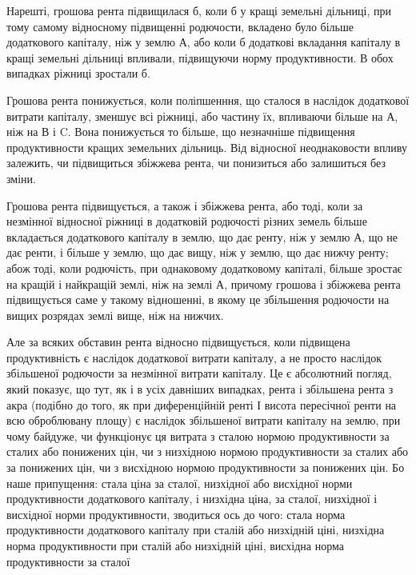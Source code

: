 
Нарешті, грошова рента підвищилася б, коли б у кращі земельні дільниці,
при тому самому відносному підвищенні родючости, вкладено було більше
додаткового капіталу, ніж у землю А, або коли б додаткові вкладання капіталу в кращі
земельні дільниці впливали, підвищуючи норму продуктивности. В обох випадках
ріжниці зростали б.

Грошова рента понижується, коли поліпшенння, що сталося в наслідок
додаткової витрати капіталу, зменшує всі ріжниці, або частину їх, впливаючи
більше на А, ніж на В і C. Вона понижується то більше, що незначніше
підвищення продуктивности кращих земельних дільниць. Від відносної неоднаковости
впливу залежить, чи підвищиться збіжжева рента, чи понизиться або
залишиться без зміни.

Грошова рента підвищується, а також і збіжжева рента, або тоді, коли за
незмінної відносної ріжниці в додатковій родючості різних земель більше вкладається
додаткового капіталу в землю, що дає ренту, ніж у землю А, що не дає
ренти, і більше у землю, що дає вищу, ніж у землю, що дає нижчу ренту;
абож тоді, коли родючість, при однаковому додатковому капіталі, більше зростає
на кращій і найкращій землі, ніж на землі А, причому грошова і збіжжева
рента підвищується саме у такому відношенні, в якому це збільшення родючости
на вищих розрядах землі вище, ніж на нижчих.

Але за всяких обставин рента відносно підвищується, коли підвищена продуктивність
є наслідок додаткової витрати капіталу, а не просто наслідок
збільшеної родючости за незмінної витрати капіталу. Це є абсолютний погляд,
який показує, що тут, як і в усіх давніших випадках, рента і збільшена рента з акра
(подібно до того, як при диференційній ренті І висота пересічної ренти на всю
оброблювану площу) є наслідок збільшеної витрати капіталу на землю, при
чому байдуже, чи функціонує ця витрата з сталою нормою продуктивности за
сталих або понижених цін, чи з низхідною нормою продуктивности за сталих або
за понижених цін, чи з висхідною нормою продуктивности за понижених цін.
Бо наше припущення: стала ціна за сталої, низхідної або висхідної норми продуктивности додаткового
капіталу, і низхідна ціна, за сталої, низхідної і висхідної
норми продуктивности, зводиться ось до чого: стала норма продуктивности додаткового капіталу при
сталій або низхідній ціні, низхідна норма продуктивности
при сталій або низхідній ціні, висхідна норма продуктивности за сталої

\parbreak{}  %
